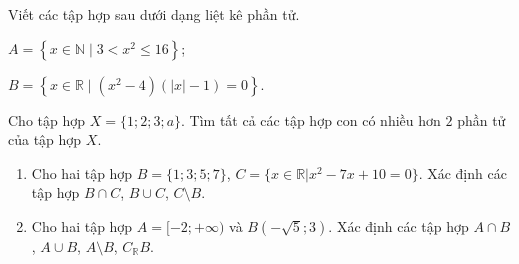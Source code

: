 \setcounter{bt}{0}

\begin{bt}%
	Viết các tập hợp sau dưới dạng liệt kê phần tử.
	\begin{enumEX}{2}
		\item $A=\left\{x\in \mathbb{N}\mid 3<x^2\le 16\right\}$;
		\item $B=\left\{x\in \mathbb{R}\mid(x^2-4)(|x|-1)=0\right\}$.
	\end{enumEX}
\end{bt}
\begin{bt}%
	Cho tập hợp $X=\{1;2;3;a\}$. Tìm tất cả các tập hợp con có nhiều hơn $2$ phần tử của tập hợp $X$.
\end{bt}
\begin{bt}%
	\begin{enumerate}
		\item Cho hai tập hợp $B=\{1;3;5;7\}$, $C=\{x\in \mathbb{R}\big| x^2-7x+10=0\}$. Xác định các tập hợp $B\cap C$, $B\cup C$, $C\setminus B$.
		\item Cho hai tập hợp $A=[-2;+\infty)$ và $B(-\sqrt{5};3)$. Xác định các tập hợp $A\cap B$, $A\cup B$, $A\setminus B$, $C_{\mathbb{R}}B$.
	\end{enumerate}
\loigiai{
\begin{enumerate}
	\item Ta có $C=\{2;5\}$.\\
	Suy ra $B\cap C=\{5\}$, $B\cup C=\{1;3;5;7;2\}$, $C\setminus B=\{2\}$.
	\item $A\cap B=[-2;3)$, $A\cup B=(-\sqrt{5};+\infty)$, $A\setminus B=[3;+\infty)$, $C_{\mathbb{R}}B=(-\infty;-\sqrt{5}]\cup [3;+\infty)$.
\end{enumerate}
}
\end{bt}

